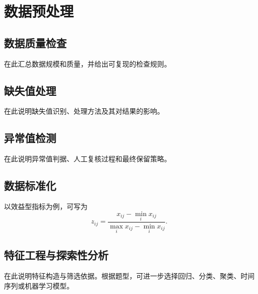 \section{数据预处理}

\subsection{数据质量检查}
在此汇总数据规模和质量，并给出可复现的检查规则。

\subsection{缺失值处理}
在此说明缺失值识别、处理方法及其对结果的影响。

\subsection{异常值检测}
在此说明异常值判据、人工复核过程和最终保留策略。

\subsection{数据标准化}
以效益型指标为例，可写为
\begin{equation}
  z_{ij}=\frac{x_{ij}-\min_i x_{ij}}{\max_i x_{ij}-\min_i x_{ij}}.
  \label{eq:normalization}
\end{equation}

\subsection{特征工程与探索性分析}
在此说明特征构造与筛选依据。根据题型，可进一步选择回归、分类、聚类、时间序列或机器学习模型。
